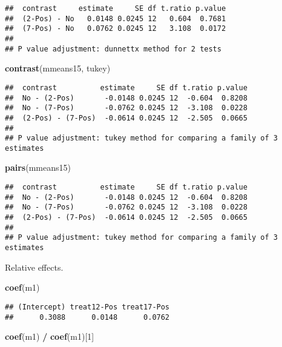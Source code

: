 \documentclass[
]{article}
\newenvironment{Shaded}{\begin{snugshade}}{\end{snugshade}}
\newcommand{\DecValTok}[1]{\textcolor[rgb]{0.00,0.00,0.81}{#1}}
\newcommand{\FunctionTok}[1]{\textcolor[rgb]{0.13,0.29,0.53}{\textbf{#1}}}
\newcommand{\NormalTok}[1]{#1}
\newcommand{\SpecialCharTok}[1]{\textcolor[rgb]{0.81,0.36,0.00}{\textbf{#1}}}
\newcommand{\StringTok}[1]{\textcolor[rgb]{0.31,0.60,0.02}{#1}}
\begin{document}
\begin{verbatim}
##  contrast     estimate     SE df t.ratio p.value
##  (2-Pos) - No   0.0148 0.0245 12   0.604  0.7681
##  (7-Pos) - No   0.0762 0.0245 12   3.108  0.0172
## 
## P value adjustment: dunnettx method for 2 tests
\end{verbatim}

\begin{Shaded}
\begin{Highlighting}[]
\FunctionTok{contrast}\NormalTok{(mmeans15, }\StringTok{\textquotesingle{}tukey\textquotesingle{}}\NormalTok{)}
\end{Highlighting}
\end{Shaded}

\begin{verbatim}
##  contrast          estimate     SE df t.ratio p.value
##  No - (2-Pos)       -0.0148 0.0245 12  -0.604  0.8208
##  No - (7-Pos)       -0.0762 0.0245 12  -3.108  0.0228
##  (2-Pos) - (7-Pos)  -0.0614 0.0245 12  -2.505  0.0665
## 
## P value adjustment: tukey method for comparing a family of 3 estimates
\end{verbatim}

\begin{Shaded}
\begin{Highlighting}[]
\FunctionTok{pairs}\NormalTok{(mmeans15)}
\end{Highlighting}
\end{Shaded}

\begin{verbatim}
##  contrast          estimate     SE df t.ratio p.value
##  No - (2-Pos)       -0.0148 0.0245 12  -0.604  0.8208
##  No - (7-Pos)       -0.0762 0.0245 12  -3.108  0.0228
##  (2-Pos) - (7-Pos)  -0.0614 0.0245 12  -2.505  0.0665
## 
## P value adjustment: tukey method for comparing a family of 3 estimates
\end{verbatim}

Relative effects.

\begin{Shaded}
\begin{Highlighting}[]
\FunctionTok{coef}\NormalTok{(m1)}
\end{Highlighting}
\end{Shaded}

\begin{verbatim}
## (Intercept) treat12-Pos treat17-Pos 
##      0.3088      0.0148      0.0762
\end{verbatim}

\begin{Shaded}
\begin{Highlighting}[]
\FunctionTok{coef}\NormalTok{(m1) }\SpecialCharTok{/} \FunctionTok{coef}\NormalTok{(m1)[}\DecValTok{1}\NormalTok{]}
\end{Highlighting}
\end{Shaded}
\end{document}
